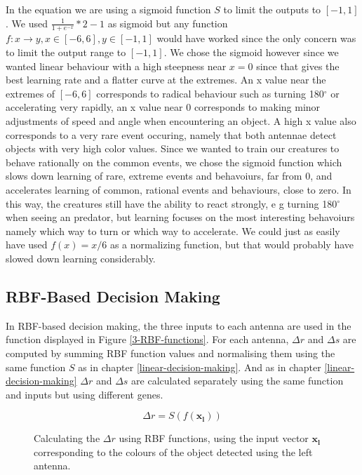 \documentclass[a4paper,11pt]{kth-mag}
\begin{document}
In the equation we are using a sigmoid function $S$ to limit the outputs to $[-1,1]$. We used $\frac{1}{1+e^{-x}} * 2 -1$ as sigmoid but any function $f:x\rightarrow y, x\in [-6,6], y \in [-1,1]$ would have worked since the only concern was to limit the output range to $[-1,1]$. We chose the sigmoid however since we wanted linear behaviour with a high steepness near $x=0$ since that gives the best learning rate and a flatter curve at the extremes. An x value near the extremes of $[-6,6]$ corresponds to radical behaviour such as turning 180$^\circ$ or accelerating very rapidly, an x value near 0 corresponds to making minor adjustments of speed and angle when encountering an object. A high x value also corresponds to a very rare event occuring, namely that both antennae detect objects with very high color values. Since we wanted to train our creatures to behave rationally on the common events, we chose the sigmoid function which slows down learning of rare, extreme events and behavoiurs, far from 0, and accelerates learning of common, rational events and behaviours, close to zero. In this way, the creatures still have the ability to react strongly, e g turning 180$^\circ$ when seeing an predator, but learning focuses on the most interesting behavoiurs namely which way to turn or which way to accelerate. We could just as easily have used $f(x) = x/6$ as a normalizing function, but that would probably have slowed down learning considerably.


\subsection{RBF-Based Decision Making}

In RBF-based decision making, the three inputs to each antenna are used in the function displayed in Figure \ref{3-RBF-functions}. For each antenna, $\Delta r$  and $\Delta s$ are computed by summing RBF function values and normalising them using the same function $S$ as in chapter \ref{linear-decision-making}. And as in chapter \ref{linear-decision-making} $\Delta r$ and $\Delta s$ are calculated separately using the same function and inputs but using different genes.

\begin{figure}
\begin{equation}
\Delta r = S(f(\mathbf{x_{l}}))
\end{equation}
\caption{Calculating the $\Delta r$ using RBF functions, using the input vector $\mathbf{x_{l}}$ corresponding to the colours of the object detected using the left antenna.\label{RBF-decide}}
\end{figure}
\end{document}

